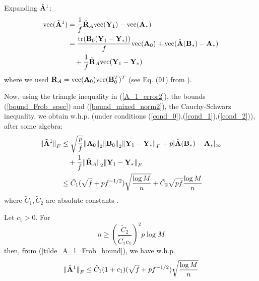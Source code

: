 \begin{IEEEproof}
Expanding $\tilde{{\mathbf{A}}}^1$:
\begin{align}
	{ \text{vec} }(\tilde{{\mathbf{A}}}^1) &= \frac{1}{f} \hat{{\mathbf{R}}}_A { \text{vec} }({\mathbf{Y}}_1) - { \text{vec} }({\mathbf{A}}_*) \nonumber \\
		&= \frac{{ \text{tr} }({\mathbf{B}}_0({\mathbf{Y}}_1-{\mathbf{Y}}_*))}{f} { \text{vec} }({\mathbf{A}}_0) + { \text{vec} }(\hat{{\mathbf{A}}}({\mathbf{B}}_*)-{\mathbf{A}}_*) \nonumber \\
		&\quad + \frac{1}{f} \tilde{{\mathbf{R}}}_A { \text{vec} }({\mathbf{Y}}_1-{\mathbf{Y}}_*) \label{A_1_error2}
\end{align}
where we used ${\mathbf{R}}_A = { \text{vec} }({\mathbf{A}}_0){ \text{vec} }({\mathbf{B}}_0^T)^T$ (see Eq. (91) from \cite{EstCovMatKron}).

Now, using the triangle inequality in (\ref{A_1_error2}), the bounds (\ref{bound_Frob_spec}) and (\ref{bound_mixed_norm2}), the Cauchy-Schwarz inequality, we obtain w.h.p. (under conditions (\ref{cond_0}),(\ref{cond_1}),(\ref{cond_2})), after some algebra:
\begin{align}
	{ \parallel } \tilde{{\mathbf{A}}}^1 { \parallel }_F &\leq \sqrt{\frac{p}{f}} { \parallel } {\mathbf{A}}_0{ \parallel }_2 { \parallel } {\mathbf{B}}_0{ \parallel }_2 { \parallel } {\mathbf{Y}}_1-{\mathbf{Y}}_* { \parallel }_F + p |\hat{{\mathbf{A}}}({\mathbf{B}}_*)-{\mathbf{A}}_*|_\infty \nonumber \\
		&\quad + \frac{1}{f} { \parallel }\tilde{{\mathbf{R}}}_A{ \parallel }_2 { \parallel } {\mathbf{Y}}_1-{\mathbf{Y}}_* { \parallel }_F  \nonumber \\
		&\leq \tilde{C}_1 (\sqrt{f}+pf^{-1/2}) \sqrt{\frac{\log M}{n}} + \tilde{C}_2 \sqrt{pf} \frac{\log M}{n} \label{tilde_A_1_Frob_bound}
\end{align}
where $\tilde{C}_1,\tilde{C}_2$ are absolute constants \cite{TsiligkaridisTSP}.

Let $c_1>0$. For
\begin{equation} \label{cond_3}
	n \geq (\frac{\tilde{C}_2}{\tilde{C}_1 c_1})^2 p \log M
\end{equation}
then, from (\ref{tilde_A_1_Frob_bound}), we have w.h.p.
\begin{equation} \label{tilde_A_1_Frob2}
	{ \parallel } \tilde{{\mathbf{A}}}^1 { \parallel }_F \leq \tilde{C}_1 (1+c_1) (\sqrt{f}+pf^{-1/2}) \sqrt{\frac{\log M}{n}}
\end{equation}


\end{IEEEproof}
